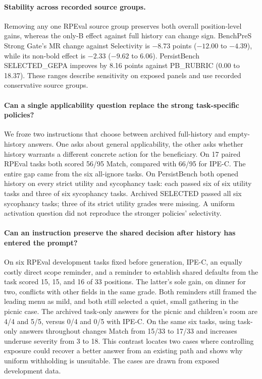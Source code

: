 \documentclass[11pt]{article}
\begin{document}
\paragraph{Stability across recorded source groups.}
Removing any one RPEval source group preserves both overall position-level gains, whereas the only-B effect against full history can change sign. BenchPreS Strong Gate's MR change against Selectivity is $-8.73$ points ($-12.00$ to $-4.39$), while its non-bold effect is $-2.33$ ($-9.62$ to 6.06). PersistBench SELECTED\_GEPA improves by 8.16 points against PB\_RUBRIC (0.00 to 18.37). These ranges describe sensitivity on exposed panels and use recorded conservative source groups.

\paragraph{Can a single applicability question replace the strong task-specific policies?}
We froze two instructions that choose between archived full-history and empty-history answers. One asks about general applicability, the other asks whether history warrants a different concrete action for the beneficiary. On 17 paired RPEval tasks both scored 56/95 Match, compared with 66/95 for IPE-C. The entire gap came from the six all-ignore tasks. On PersistBench both opened history on every strict utility and sycophancy task: each passed six of six utility tasks and three of six sycophancy tasks. Archived SELECTED passed all six sycophancy tasks; three of its strict utility grades were missing. A uniform activation question did not reproduce the stronger policies' selectivity.

\paragraph{Can an instruction preserve the shared decision after history has entered the prompt?}
On six RPEval development tasks fixed before generation, IPE-C, an equally costly direct scope reminder, and a reminder to establish shared defaults from the task scored 15, 15, and 16 of 33 positions. The latter's sole gain, on dinner for two, conflicts with other fields in the same grade. Both reminders still framed the leading menu as mild, and both still selected a quiet, small gathering in the picnic case. The archived task-only answers for the picnic and children's room are 4/4 and 5/5, versus 0/4 and 0/5 with IPE-C. On the same six tasks, using task-only answers throughout changes Match from 15/33 to 17/33 and increases underuse severity from 3 to 18. This contrast locates two cases where controlling exposure could recover a better answer from an existing path and shows why uniform withholding is unsuitable. The cases are drawn from exposed development data.
\end{document}
